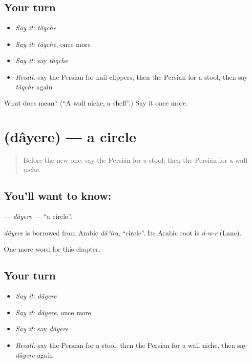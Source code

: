 \subsection*{Your turn}
\begin{itemize}
\raggedright
  \item \emph{Say it:} \emph{tâqche}
  \item \emph{Say it:} \emph{tâqche}, once more
  \item \emph{Say it:} say \emph{tâqche}
  \item \emph{Recall:} say the Persian for nail clippers, then the Persian for a stool, then say \emph{tâqche} again
\end{itemize}

\begin{tcolorbox}[breakable,colback=teal!4,colframe=teal!35!black,title={Before you move on}]
What does  mean? (\textquotedblleft{}A wall niche, a shelf\textquotedblright{}.) Say it once more.
\end{tcolorbox}
\section[\texorpdfstring{\fa{دایره} (dâyere)}{دایره (dâyere)}]{ (dâyere) — a circle}

\label{lesson:FA-C213-dayere}



\begin{quote}
Before the new one: say the Persian for a stool, then the Persian for a wall niche.
\end{quote}

\subsection*{You'll want to know: }
\textbf{} — \emph{dâyere} — \textquotedblleft{}a circle\textquotedblright{}.

\begin{cousinweb}
\emph{dâyere} is borrowed from Arabic \emph{dāʾira}, \textquotedblleft{}circle\textquotedblright{}. Its Arabic root is \emph{d-w-r} (Lane).
\end{cousinweb}

\begin{grammarlens}[title={What you've built}]
One more word for this chapter.
\end{grammarlens}

\subsection*{Your turn}
\begin{itemize}
\raggedright
  \item \emph{Say it:} \emph{dâyere}
  \item \emph{Say it:} \emph{dâyere}, once more
  \item \emph{Say it:} say \emph{dâyere}
  \item \emph{Recall:} say the Persian for a stool, then the Persian for a wall niche, then say \emph{dâyere} again
\end{itemize}

